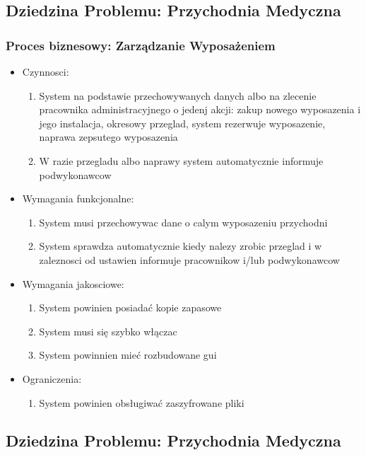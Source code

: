 \documentclass{article}
\begin{document}
	\subsection* {Dziedzina Problemu: Przychodnia Medyczna}
	\subsubsection*{Proces biznesowy: Zarządzanie Wyposażeniem}
	
	\begin{itemize}
		\item Czynnosci:
		\begin{enumerate}
			\item System na podstawie przechowywanych danych albo na zlecenie pracownika administracyjnego o jedenj akcji: zakup nowego wyposazenia i jego instalacja, okresowy przeglad, system rezerwuje wyposazenie, naprawa zepsutego wyposazenia
			\item W razie przegladu albo naprawy system automatycznie informuje podwykonawcow
		\end{enumerate}
		\item Wymagania funkcjonalne: 
		\begin{enumerate}
			\item System musi przechowywac dane o calym wyposazeniu przychodni
			\item System sprawdza automatycznie kiedy nalezy zrobic przeglad i w zaleznosci od ustawien informuje pracownikow i/lub podwykonawcow 
		\end{enumerate}
		\item Wymagania jakosciowe:
		\begin{enumerate}
			\item System powinien posiadać kopie zapasowe
			\item System musi się szybko włączac 
			\item System powinnien mieć rozbudowane gui
		\end{enumerate}
		\item Ograniczenia:
		\begin{enumerate}
			\item System powinien obsługiwać zaszyfrowane pliki 
		\end{enumerate}
	\end{itemize}
	
	\subsection*{Dziedzina Problemu: Przychodnia Medyczna}
\end{document}
